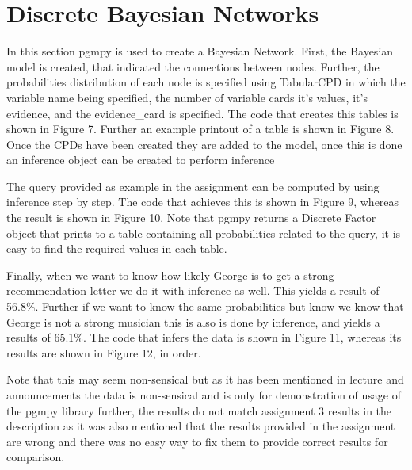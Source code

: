 \documentclass[12pt, letter]{article}
\begin{document}
\FloatBarrier


\section{Discrete Bayesian Networks}

In this section pgmpy is used to create a Bayesian Network. First, the Bayesian model is created, that indicated the connections between nodes. Further, the probabilities distribution of each node is specified using TabularCPD in which the variable name being specified, the number of variable cards it's values, it's evidence, and the evidence\_card is specified. The code that creates this tables is shown in Figure 7. Further an example printout of a table is shown in Figure 8. Once the CPDs have been created they are added to the model, once this is done an inference object can be created to perform inference

The query provided as example in the assignment can be computed by using inference step by step. The code that achieves this is shown in Figure 9, whereas the result is shown in Figure 10. Note that pgmpy returns a Discrete Factor object that prints to a table containing all probabilities related to the query, it is easy to find the required values in each table. 

Finally, when we want to know how likely George is to get a strong recommendation letter we do it with inference as well. This yields a result of 56.8\%. Further if we want to know the same probabilities but know we know that George is not a strong musician this is also is done by inference, and yields a results of 65.1\%. The code that infers the data is shown in Figure 11, whereas its results are shown in Figure 12, in order. 

Note that this may seem non-sensical but as it has been mentioned in lecture and announcements the data is non-sensical and is only for demonstration of usage of the pgmpy library further, the results do not match assignment 3 results in the description as it was also mentioned that the results provided in the assignment are wrong and there was no easy way to fix them to provide correct results for comparison.
\end{document}
